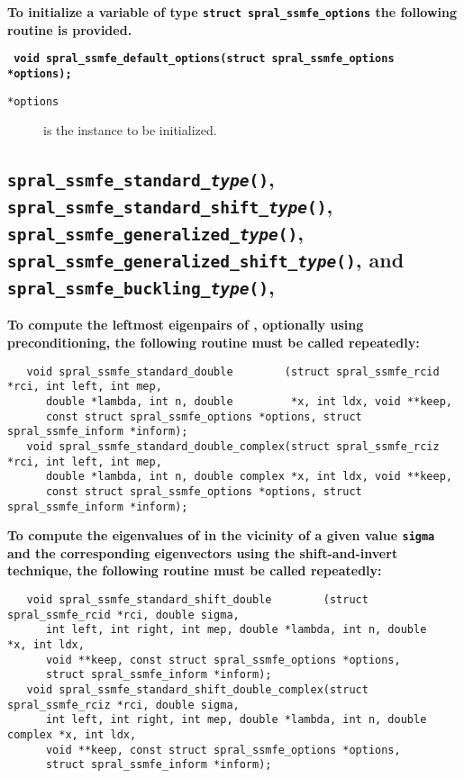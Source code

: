 \textbf{To initialize a variable of type \texttt{struct spral\_ssmfe\_options}
the following routine is provided.}

\medskip
\noindent
\textbf{\texttt{
      \hspace*{0.3cm} void spral\_ssmfe\_default\_options(struct spral\_ssmfe\_options *options);
}}

\noindent
\begin{description}
   \item[\texttt{*options}] is the instance to be initialized.
\end{description}

\subsection{%
   \texttt{spral\_ssmfe\_standard\_\textit{type}()},
   \texttt{spral\_ssmfe\_standard\_shift\_\textit{type}()}, \\
   \texttt{spral\_ssmfe\_generalized\_\textit{type}()},
   \texttt{spral\_ssmfe\_generalized\_shift\_\textit{type}()}, and
   \texttt{spral\_ssmfe\_buckling\_\textit{type}()},
}

{\bf
To compute
the leftmost eigenpairs of ,
optionally using preconditioning,
the following routine must be called repeatedly:
}

\begin{verbatim}
   void spral_ssmfe_standard_double        (struct spral_ssmfe_rcid *rci, int left, int mep,
      double *lambda, int n, double         *x, int ldx, void **keep,
      const struct spral_ssmfe_options *options, struct spral_ssmfe_inform *inform);
   void spral_ssmfe_standard_double_complex(struct spral_ssmfe_rciz *rci, int left, int mep,
      double *lambda, int n, double complex *x, int ldx, void **keep,
      const struct spral_ssmfe_options *options, struct spral_ssmfe_inform *inform);
\end{verbatim}

\medskip
\noindent
{\bf
To compute the eigenvalues of  %
in the vicinity of 
a given value {\tt sigma}
and the corresponding eigenvectors using the shift-and-invert technique,
the following routine must be called repeatedly:
}
\begin{verbatim}
   void spral_ssmfe_standard_shift_double        (struct spral_ssmfe_rcid *rci, double sigma,
      int left, int right, int mep, double *lambda, int n, double         *x, int ldx,
      void **keep, const struct spral_ssmfe_options *options,
      struct spral_ssmfe_inform *inform);
   void spral_ssmfe_standard_shift_double_complex(struct spral_ssmfe_rciz *rci, double sigma,
      int left, int right, int mep, double *lambda, int n, double complex *x, int ldx,
      void **keep, const struct spral_ssmfe_options *options,
      struct spral_ssmfe_inform *inform);
\end{verbatim}

